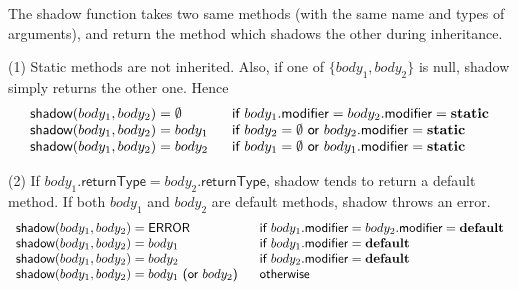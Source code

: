 The \textsf{shadow} function takes two same methods (with the same name and types of arguments), and return the method which shadows the other during inheritance.

(1) Static methods are not inherited. Also, if one of $\{body_1,body_2\}$ is null, \textsf{shadow} simply returns the other one. Hence
\begin{equation*}
\begin{array}{ll}
\textsf{shadow}(body_1, body_2)=\emptyset & \textsf{if }body_1.\textsf{modifier}=body_2.\textsf{modifier}=\textbf{static}\\
\textsf{shadow}(body_1, body_2)=body_1 & \textsf{if }body_2=\emptyset\textsf{ or }body_2.\textsf{modifier}=\textbf{static}\\
\textsf{shadow}(body_1, body_2)=body_2 \hspace{.1in}  & \textsf{if }body_1=\emptyset\textsf{ or }body_1.\textsf{modifier}=\textbf{static}
\end{array}
\end{equation*}

(2) If $body_1.\textsf{returnType}=body_2.\textsf{returnType}$, \textsf{shadow} tends to return a default method. If both $body_1$ and $body_2$ are default methods, \textsf{shadow} throws an error.
\begin{equation*}
\begin{array}{ll}
\textsf{shadow}(body_1, body_2)=\textsf{ERROR} & \textsf{if }body_1.\textsf{modifier}=body_2.\textsf{modifier}=\textbf{default}\\
\textsf{shadow}(body_1, body_2)=body_1 \hspace{.1in} & \textsf{if }body_1.\textsf{modifier}=\textbf{default} \\
\textsf{shadow}(body_1, body_2)=body_2 \hspace{.1in} & \textsf{if }body_2.\textsf{modifier}=\textbf{default} \\
\textsf{shadow}(body_1, body_2)=body_1\textsf{ (or }body_2\textsf{)} \hspace{.1in} & \textsf{otherwise}
\end{array}
\end{equation*}

